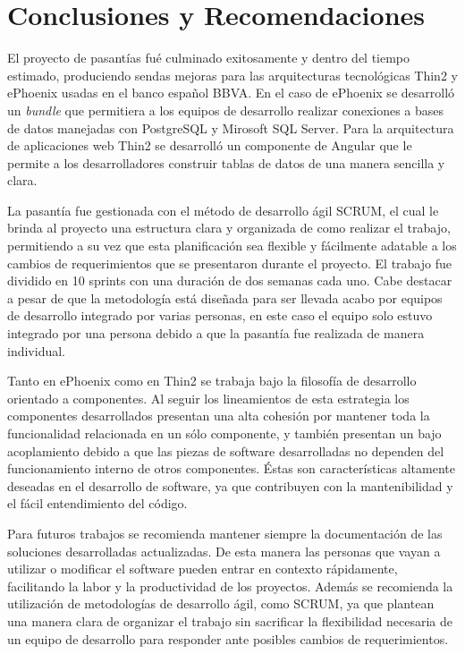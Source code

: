 \chapter{Conclusiones y Recomendaciones}
\label{conclusiones}

El proyecto de pasantías fué culminado exitosamente y dentro del tiempo
estimado, produciendo sendas mejoras para las arquitecturas tecnológicas
Thin2 y ePhoenix usadas en el banco español BBVA. En el caso de ePhoenix
se desarrolló un \emph{bundle} que permitiera a los equipos de desarrollo
realizar conexiones a bases de datos manejadas con PostgreSQL y Mirosoft SQL
Server. Para la arquitectura de aplicaciones web Thin2 se desarrolló un
componente de Angular que le permite a los desarrolladores construir tablas
de datos de una manera sencilla y clara.

La pasantía fue gestionada con el método de desarrollo ágil SCRUM, el
cual le brinda al proyecto una estructura clara y organizada de como realizar
el trabajo, permitiendo a su vez que esta planificación sea flexible y fácilmente
adatable a los cambios de requerimientos que se presentaron durante el proyecto.
El trabajo fue dividido en 10 sprints con una duración de dos semanas cada uno.
Cabe destacar a pesar de que la metodología está diseñada para ser llevada acabo
por equipos de desarrollo integrado por varias personas, en este caso el equipo
solo estuvo integrado por una persona debido a que la pasantía fue realizada
de manera individual.

Tanto en ePhoenix como en Thin2 se trabaja bajo la filosofía de desarrollo orientado
a componentes. Al seguir los lineamientos de esta estrategia los componentes desarrollados
presentan una alta cohesión por mantener toda la funcionalidad
relacionada en un sólo componente, y también presentan un bajo acoplamiento debido
a que las piezas de software desarrolladas no dependen del funcionamiento interno de otros
componentes. Éstas son características altamente deseadas en el desarrollo de software, ya que
contribuyen con la mantenibilidad y el fácil entendimiento del código.

Para futuros trabajos se recomienda mantener siempre la documentación de las soluciones
desarrolladas actualizadas. De esta manera las personas que vayan a utilizar o modificar
el software pueden entrar en contexto rápidamente, facilitando la labor y la productividad
de los proyectos. Además se recomienda la utilización de metodologías de desarrollo ágil,
como SCRUM, ya que plantean una manera clara de organizar el trabajo sin sacrificar
la flexibilidad necesaria de un equipo de desarrollo para responder ante posibles cambios de
requerimientos.
